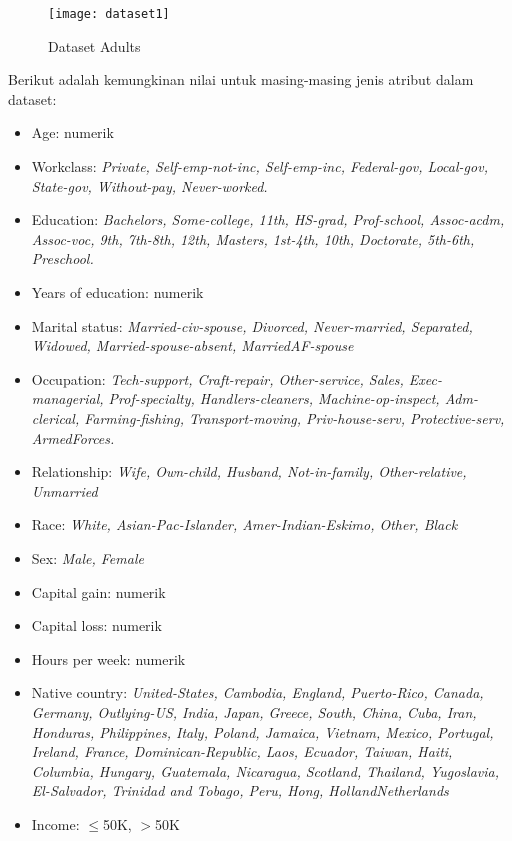 \begin{figure}[H]
	\centering
	\texttt{[image: dataset1]}
	\caption{Dataset Adults}
	\label{fig:dataset1}
\end{figure}

\noindent Berikut adalah kemungkinan nilai untuk masing-masing jenis atribut dalam dataset:

\begin{itemize}
\item Age: numerik

\item Workclass: \textit{Private, Self-emp-not-inc, Self-emp-inc, Federal-gov, Local-gov, State-gov, Without-pay, Never-worked.}

\item Education: \textit{Bachelors, Some-college, 11th, HS-grad, Prof-school, Assoc-acdm, Assoc-voc, 9th, 7th-8th, 12th, Masters, 1st-4th, 10th, Doctorate, 5th-6th, Preschool.}

\item Years of education: numerik

\item Marital status: 
\textit{Married-civ-spouse, Divorced, Never-married, Separated, Widowed, Married-spouse-absent, MarriedAF-spouse}

\item Occupation: \textit{Tech-support, Craft-repair, Other-service, Sales, Exec-managerial, Prof-specialty, Handlers-cleaners, Machine-op-inspect, Adm-clerical, Farming-fishing, Transport-moving, Priv-house-serv, Protective-serv, ArmedForces.}

\item Relationship: \textit{Wife, Own-child, Husband, Not-in-family, Other-relative, Unmarried}

\item Race: \textit{White, Asian-Pac-Islander, Amer-Indian-Eskimo, Other, Black}

\item Sex: \textit{Male, Female}

\item Capital gain: numerik

\item Capital loss: numerik

\item Hours per week: numerik

\item Native country: \textit{United-States, Cambodia, England, Puerto-Rico, Canada, Germany, Outlying-US, India, Japan, Greece, South, China, Cuba, Iran, Honduras, Philippines, Italy, Poland, Jamaica, Vietnam, Mexico, Portugal, Ireland, France, Dominican-Republic, Laos, Ecuador, Taiwan, Haiti, Columbia, Hungary, Guatemala, Nicaragua, Scotland, Thailand, Yugoslavia, El-Salvador, Trinidad and Tobago, Peru, Hong, HollandNetherlands}

\item Income: $\leq$50K, $>$50K
\end{itemize}


